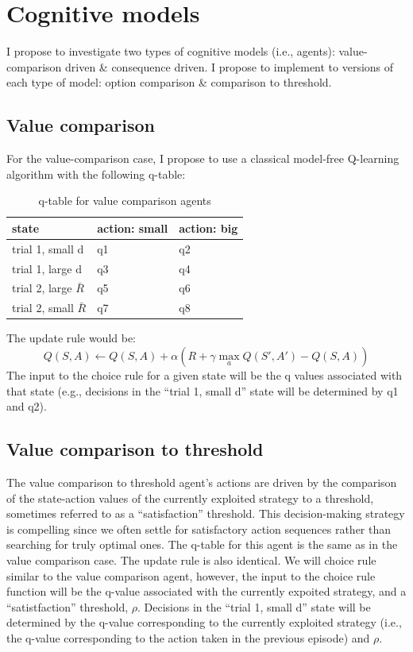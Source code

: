 \documentclass[11pt]{article}
\begin{document}
\section{Cognitive models}
\label{sec:org91fa735}
I propose to investigate two types of cognitive models (i.e., agents): value-comparison driven \& consequence driven. I propose to implement to versions of each type of model: option comparison \& comparison to threshold.
\subsection{Value comparison}
\label{sec:orgb3fb68a}
For the value-comparison case, I propose to use a classical model-free Q-learning algorithm with the following q-table:
\begin{table}[htbp]
\caption{q-table for value comparison agents}
\centering
\begin{tabular}{|l|l|l|}
\hline
state & action: small & action: big\\
\hline
trial 1, small d & q1 & q2\\
trial 1, large d & q3 & q4\\
trial 2, large \(\bar{R}\) & q5 & q6\\
trial 2, small \(\bar{R}\) & q7 & q8\\
\hline
\end{tabular}
\end{table}
The update rule would be:
\begin{equation}
Q(S, A) \gets Q(S, A) + \alpha (R + \gamma \max_a Q(S', A') - Q(S, A))
\end{equation}
The input to the choice rule for a given state will be the q values associated with that state (e.g., decisions in the ``trial 1, small d'' state will be determined by q1 and q2).
\subsection{Value comparison to threshold}
\label{sec:org25ce274}
The value comparison to threshold agent's actions are driven by the comparison of the state-action values of the currently exploited strategy to a threshold, sometimes referred to as a ``satisfaction'' threshold. This decision-making strategy is compelling since we often settle for satisfactory action sequences rather than searching for truly optimal ones.
The q-table for this agent is the same as in the value comparison case.
The update rule is also identical.
We will choice rule similar to the value comparison agent, however, the input to the choice rule function will be the q-value associated with the currently expoited strategy, and a ``satistfaction'' threshold, \(\rho\). Decisions in the ``trial 1, small d'' state will be determined by the q-value corresponding to the currently exploited strategy (i.e., the q-value corresponding to the action taken in the previous episode) and \(\rho\).
\end{document}
